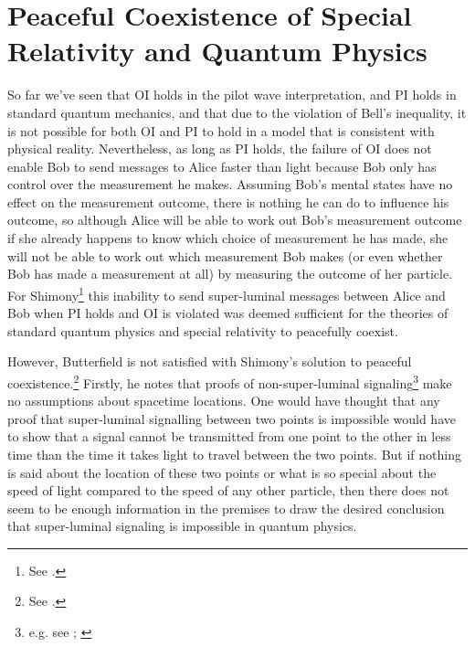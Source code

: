 \section{Peaceful Coexistence of Special Relativity and Quantum Physics}
So far we've seen that OI holds in the pilot wave interpretation, and PI holds in standard quantum mechanics, and that due to the violation of Bell's inequality, it is not possible for both OI and PI to hold in a model that is consistent with physical reality. Nevertheless, as long as PI holds, the failure of OI does not enable Bob to send messages to Alice faster than light because Bob only has control over the measurement he makes. Assuming Bob's mental states have no effect on the measurement outcome, there is nothing he can do to influence his outcome, so although Alice will be able to work out Bob's measurement outcome if she already happens to know which choice of measurement he has made, she will not be able to work out which measurement Bob makes (or even whether Bob has made a measurement at all) by measuring the outcome of her particle. For Shimony\footnote{See \cite[146-147]{Shimony86}.} this inability to send super-luminal messages between Alice and Bob when PI holds and OI is violated was deemed sufficient for the theories of standard quantum physics and special relativity to peacefully coexist. 

However, Butterfield is not satisfied with Shimony's solution to peaceful coexistence.\footnote{See \cite[p. 12]{Butterfield}.} Firstly, he notes that proofs of non-super-luminal signaling\footnote{e.g. see \cite[p. 113--116]{Redhead}; \cite[p. 139--140]{Hiley}} make no assumptions about spacetime locations. One would have thought that any proof that super-luminal signalling between two points is impossible would have to show that a signal cannot be transmitted from one point to the other in less time than the time it takes light to travel between the two points. But if nothing is said about the location of these two points or what is so special about the speed of light compared to the speed of any other particle, then there does not seem to be enough information in the premises to draw the desired conclusion that super-luminal signaling is impossible in quantum physics.

